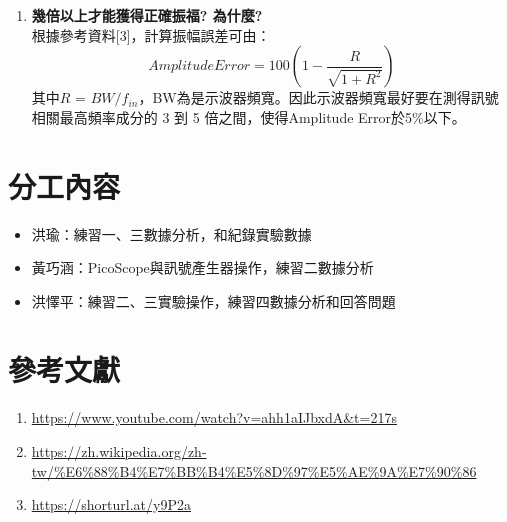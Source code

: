 \documentclass[12pt,a4paper]{article}
\begin{document}
\begin{CJK}{UTF8}{bkai}
\begin{enumerate}
\item \textbf{幾倍以上才能獲得正確振福? 為什麼?}\\

根據參考資料[3]，計算振幅誤差可由：
\begin{equation*}
    Amplitude Error = 100\left(1-\frac{R}{\sqrt{1+R^2}} \right)
\end{equation*}
其中$R$ = $BW/f_{in}$，BW為是示波器頻寬。因此示波器頻寬最好要在測得訊號相關最高頻率成分的 3 到 5 倍之間，使得Amplitude Error於5\%以下。



\end{enumerate}





\section{分工內容}
\hfill

\begin{itemize}
    \item 洪瑜：練習一、三數據分析，和紀錄實驗數據
    \item 黃巧涵：PicoScope與訊號產生器操作，練習二數據分析
    \item 洪懌平：練習二、三實驗操作，練習四數據分析和回答問題
\end{itemize}


\section{參考文獻}
\hfill
\begin{enumerate}
    \item \url{https://www.youtube.com/watch?v=ahh1aIJbxdA&t=217s}
    \item \url{https://zh.wikipedia.org/zh-tw/%E6%88%B4%E7%BB%B4%E5%8D%97%E5%AE%9A%E7%90%86}
    \item \url{https://shorturl.at/y9P2a}
\end{enumerate}
    


\end{CJK}
\end{document}
